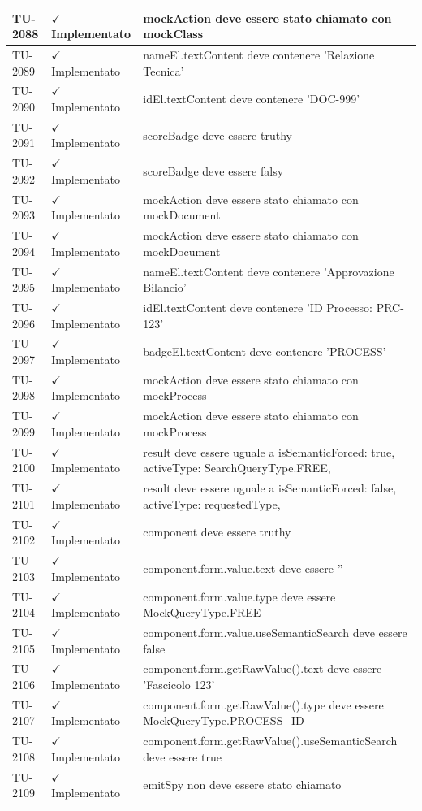 ﻿\documentclass[a4paper,12pt]{article}
\newcommand{\ok}{\textcolor{green!60!black}{$\checkmark$ Implementato}}
\begin{document}
\begin{longtable}{|p{2cm}|p{3.5cm}|p{9.5cm}|}
\hline
TU-2088 & \ok & mockAction deve essere stato chiamato con mockClass \\
\hline
TU-2089 & \ok & nameEl.textContent deve contenere 'Relazione Tecnica' \\
\hline
TU-2090 & \ok & idEl.textContent deve contenere 'DOC-999' \\
\hline
TU-2091 & \ok & scoreBadge deve essere truthy \\
\hline
TU-2092 & \ok & scoreBadge deve essere falsy \\
\hline
TU-2093 & \ok & mockAction deve essere stato chiamato con mockDocument \\
\hline
TU-2094 & \ok & mockAction deve essere stato chiamato con mockDocument \\
\hline
TU-2095 & \ok & nameEl.textContent deve contenere 'Approvazione Bilancio' \\
\hline
TU-2096 & \ok & idEl.textContent deve contenere 'ID Processo: PRC-123' \\
\hline
TU-2097 & \ok & badgeEl.textContent deve contenere 'PROCESS' \\
\hline
TU-2098 & \ok & mockAction deve essere stato chiamato con mockProcess \\
\hline
TU-2099 & \ok & mockAction deve essere stato chiamato con mockProcess \\
\hline
TU-2100 & \ok & result deve essere uguale a { isSemanticForced: true, activeType: SearchQueryType.FREE, } \\
\hline
TU-2101 & \ok & result deve essere uguale a { isSemanticForced: false, activeType: requestedType, } \\
\hline
TU-2102 & \ok & component deve essere truthy \\
\hline
TU-2103 & \ok & component.form.value.text deve essere '' \\
\hline
TU-2104 & \ok & component.form.value.type deve essere MockQueryType.FREE \\
\hline
TU-2105 & \ok & component.form.value.useSemanticSearch deve essere false \\
\hline
TU-2106 & \ok & component.form.getRawValue().text deve essere 'Fascicolo 123' \\
\hline
TU-2107 & \ok & component.form.getRawValue().type deve essere MockQueryType.PROCESS\_ID \\
\hline
TU-2108 & \ok & component.form.getRawValue().useSemanticSearch deve essere true \\
\hline
TU-2109 & \ok & emitSpy non deve essere stato chiamato \\

\end{longtable}
\end{document}

